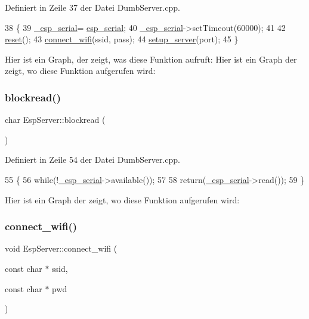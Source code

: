 Definiert in Zeile 37 der Datei Dumb\+Server.\+cpp.


\begin{DoxyCode}
38 \{
39   \hyperlink{class_esp_server_a33166aa92db341d47cdf1776492cca62}{\_esp\_serial}= \hyperlink{_arduino__kommentiert_8ino_af690b3a6882292855c4091ede8039998}{esp\_serial};
40   \hyperlink{class_esp_server_a33166aa92db341d47cdf1776492cca62}{\_esp\_serial}->setTimeout(60000);
41 
42   \hyperlink{class_esp_server_aeabfb2610ecfdc26e8ce0e624221067f}{reset}();
43   \hyperlink{class_esp_server_a6df2412420218304713dd25715e17198}{connect\_wifi}(ssid, pass);
44   \hyperlink{class_esp_server_a215752989c25b9819ca06bc8f94845ed}{setup\_server}(port);
45 \}
\end{DoxyCode}
Hier ist ein Graph, der zeigt, was diese Funktion aufruft\+:
Hier ist ein Graph der zeigt, wo diese Funktion aufgerufen wird\+:
\mbox{\label{class_esp_server_a3da02efeb5f2cbe3a8a1963e5e7f0a47}} 
\subsubsection{\texorpdfstring{blockread()}{blockread()}}
{\footnotesize\ttfamily char Esp\+Server\+::blockread (\begin{DoxyParamCaption}{ }\end{DoxyParamCaption})\hspace{0.3cm}{\ttfamily [private]}}



Definiert in Zeile 54 der Datei Dumb\+Server.\+cpp.


\begin{DoxyCode}
55 \{
56   \textcolor{keywordflow}{while}(!\hyperlink{class_esp_server_a33166aa92db341d47cdf1776492cca62}{\_esp\_serial}->available());
57 
58   \textcolor{keywordflow}{return}(\hyperlink{class_esp_server_a33166aa92db341d47cdf1776492cca62}{\_esp\_serial}->read());
59 \}
\end{DoxyCode}
Hier ist ein Graph der zeigt, wo diese Funktion aufgerufen wird\+:
\mbox{\label{class_esp_server_a6df2412420218304713dd25715e17198}} 
\subsubsection{\texorpdfstring{connect\+\_\+wifi()}{connect\_wifi()}}
{\footnotesize\ttfamily void Esp\+Server\+::connect\+\_\+wifi (\begin{DoxyParamCaption}\item[{const char $\ast$}]{ssid,  }\item[{const char $\ast$}]{pwd }\end{DoxyParamCaption})\hspace{0.3cm}{\ttfamily [private]}}



